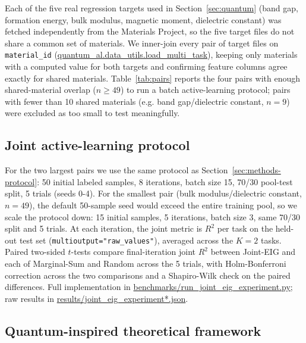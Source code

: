 \documentclass[10pt]{article}
\begin{document}
Each of the five real regression targets used in Section~\ref{sec:quantum} (band gap, formation energy, bulk modulus, magnetic moment, dielectric constant) was fetched independently from the Materials Project, so the five target files do not share a common set of materials. We inner-join every pair of target files on \texttt{material\_id} (\url{quantum_al.data_utils.load_multi_task}), keeping only materials with a computed value for both targets and confirming feature columns agree exactly for shared materials. Table~\ref{tab:pairs} reports the four pairs with enough shared-material overlap ($n\ge49$) to run a batch active-learning protocol; pairs with fewer than 10 shared materials (e.g. band gap/dielectric constant, $n=9$) were excluded as too small to test meaningfully.

\subsection{Joint active-learning protocol}\label{sec:methods-jeig-protocol}

For the two largest pairs we use the same protocol as Section~\ref{sec:methods-protocol}: 50 initial labeled samples, 8 iterations, batch size 15, 70/30 pool-test split, 5 trials (seeds 0-4). For the smallest pair (bulk modulus/dielectric constant, $n=49$), the default 50-sample seed would exceed the entire training pool, so we scale the protocol down: 15 initial samples, 5 iterations, batch size 3, same 70/30 split and 5 trials. At each iteration, the joint metric is $R^2$ per task on the held-out test set (\texttt{multioutput="raw\_values"}), averaged across the $K=2$ tasks. Paired two-sided $t$-tests compare final-iteration joint $R^2$ between Joint-EIG and each of Marginal-Sum and Random across the 5 trials, with Holm-Bonferroni correction across the two comparisons and a Shapiro-Wilk check on the paired differences. Full implementation in \url{benchmarks/run_joint_eig_experiment.py}; raw results in \url{results/joint_eig_experiment*.json}.

\subsection{Quantum-inspired theoretical framework}\label{sec:methods-quantum}
\end{document}
